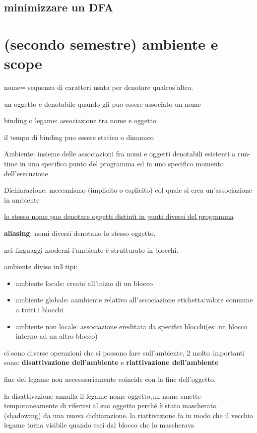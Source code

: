 \documentclass[12pt]{article}
\begin{document}
\subsection{minimizzare un DFA}


\section{(secondo semestre) ambiente e scope}

nome= sequenza di caratteri usata per denotare qualcos'altro.

un oggetto e denotabile quando gli puo essere associato un nome

binding o legame: associazione tra nome e oggetto

il tempo di binding puo essere statico o dinamico

Ambiente:
insieme delle associazioni fra nomi e oggetti denotabili
esistenti a run-time in uno specifico punto del programma ed
in uno specifico momento dell’esecuzione

Dichiarazione:
meccanismo (implicito o esplicito) col quale si crea
un’associazione in ambiente

\underline{lo stesso nome puo denotare oggetti distinti in punti diversi del programma}

\textbf{aliasing}: nomi diversi denotano lo stesso oggetto.

nei linguaggi moderni l'ambiente è strutturato in blocchi.

ambiente diviso in3 tipi:
\begin{itemize}
\item ambiente locale: creato all'inizio di un blocco
\item ambiente globale: aambiente relativo all'associazione etichetta:valore comuune  a tutti i blocchi
\item ambiente non locale: associazione ereditata da specifici blocchi(es: un blocco interno ad un altro blocco)
\end{itemize}

ci sono diverse operazioni che si possono fare sull'ambiente, 2 molto importanti sono: \textbf{disattivazione dell'ambiente} e  \textbf{riattivazione dell'ambiente}

fine del legame non necesssariamente coincide con la fine dell'oggetto.

la disattivazione annulla il legame nome-oggetto,un nome smette temporaneamente di riferirsi al suo oggetto
perché è stato mascherato (shadowing) da una nuova dichiarazione.
 la riattivazione fa in modo che il vecchio legame torna visibile
quando esci dal blocco che lo mascherava
\end{document}
